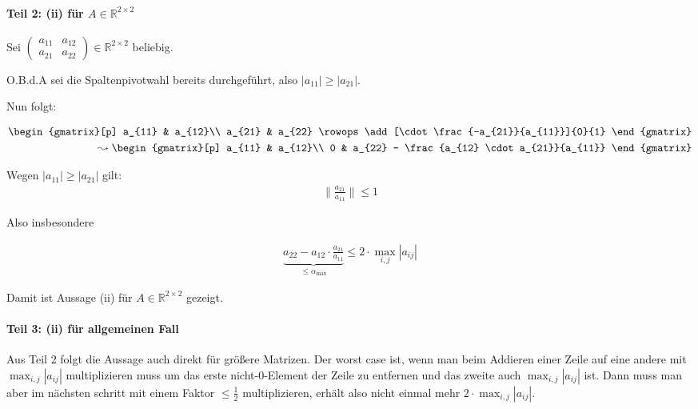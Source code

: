 \paragraph{Teil 2: (ii) für $A \in \mathbb{R}^{2 \times 2}$}
Sei $\begin{pmatrix}a_{11} & a_{12}\\a_{21} & a_{22} \end{pmatrix} \in \mathbb{R}^{2 \times 2}$
beliebig.

O.B.d.A sei die Spaltenpivotwahl bereits durchgeführt, also $|a_{11}| \geq |a_{21}|$.

Nun folgt:

\begin{align}
    \begin{gmatrix}[p]
        a_{11} & a_{12}\\
        a_{21} & a_{22}
        \rowops
        \add[\cdot \frac{-a_{21}}{a_{11}}]{0}{1}
    \end{gmatrix}\\
    \leadsto
    \begin{gmatrix}[p]
        a_{11} & a_{12}\\
        0      & a_{22} - \frac{a_{12} \cdot a_{21}}{a_{11}}
    \end{gmatrix}
\end{align}

Wegen $|a_{11}| \geq |a_{21}|$ gilt:
\begin{align}
    \|\frac{a_{21}}{a_{11}}\| \leq 1
\end{align}

Also insbesondere

\begin{align}
    \underbrace{a_{22} - a_{12} \cdot \frac{a_{21}}{a_{11}}}_{\leq \alpha_\text{max}} \leq 2 \cdot \max_{i,j}|a_{ij}|
\end{align}

Damit ist Aussage (ii) für $A \in \mathbb{R}^{2 \times 2}$ gezeigt.

\paragraph{Teil 3: (ii) für allgemeinen Fall}

Aus Teil 2 folgt die Aussage auch direkt für größere Matrizen.
Der worst case ist, wenn man beim Addieren einer Zeile auf eine
andere mit $\max_{i,j}|a_{ij}|$ multiplizieren muss um das erste nicht-0-Element
der Zeile zu entfernen und das zweite auch $\max_{i,j}|a_{ij}|$ ist.
Dann muss man aber im nächsten schritt mit einem Faktor $\leq \frac{1}{2}$
multiplizieren, erhält also nicht einmal mehr $2 \cdot \max_{i,j}|a_{ij}|$.
